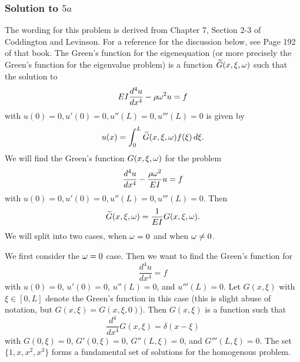 \subsubsection*{Solution to $5a$}
The wording for this problem is derived from Chapter 7, Section 2-3 of Coddington and Levinson. For a reference for the discussion below, see Page 192 of that book.
The Green's function for the eigenequation (or more precisely the Green's function for the eigenvalue problem) is a function $\widetilde{G}(x, \xi, \omega)$ such that the solution
to
\begin{align}\label{s14main}
EI\frac{d^{4}u}{dx^{4}} - \rho\omega^{2}u = f
\end{align}
with $u(0) = 0, u'(0) = 0, u''(L) = 0, u'''(L) = 0$ is given by
$$u(x) = \int_{0}^{L}\widetilde{G}(x, \xi, \omega)f(\xi)\, d\xi.$$
We will find the Green's function $G(x, \xi, \omega)$ for the problem
$$\frac{d^{4}u}{dx^{4}} - \frac{\rho\omega^{2}}{EI}u = f$$
with $u(0) = 0, u'(0) = 0, u''(L) = 0, u'''(L) = 0$. Then
\begin{align}\label{s14green_rel}
\widetilde{G}(x, \xi, \omega) = \frac{1}{EI}G(x, \xi, \omega).
\end{align}
We will split into two cases, when $\omega = 0$ and when $\omega \neq 0$.

We first consider the $\omega = 0$ case. Then we want to find the Green's function for
$$\frac{d^{4}u}{dx^{4}} = f$$
with $u(0) = 0$, $u'(0) = 0$, $u''(L) = 0$, and $u'''(L) = 0$. Let $G(x, \xi)$ with $\xi \in [0, L]$ denote the Green's function
in this case (this is slight abuse of notation, but $G(x, \xi) = G(x, \xi, 0)$). Then $G(x, \xi)$ is a function
such that
$$\frac{d^{4}}{dx^{4}}G(x, \xi) = \delta(x - \xi)$$
with $G(0, \xi) = 0$, $G'(0, \xi) = 0$, $G''(L, \xi) = 0$, and $G'''(L, \xi) = 0$.
The set $\{1, x, x^{2}, x^{3}\}$ forms a fundamental set of solutions for the homogenous problem.

